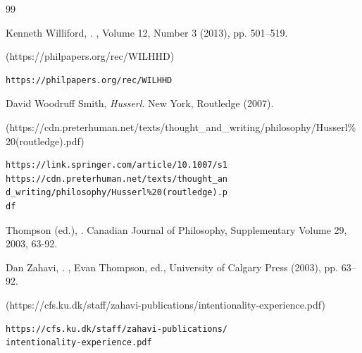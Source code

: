 \begin{thebibliography}{99}
{
Kenneth Williford, 
.
,
Volume 12, Number 3 (2013), pp. 501--519.
%
\begin{boxurl}(https://philpapers.org/rec/WILHHD)
\begin{lstlisting}
https://philpapers.org/rec/WILHHD
\end{lstlisting}
\end{boxurl}




David Woodruff Smith, 
\textit{Husserl}.
New York, Routledge (2007).
%
\begin{boxurl}(https://cdn.preterhuman.net/texts/thought_and_writing/philosophy/Husserl\%20(routledge).pdf)
\begin{lstlisting}
https://link.springer.com/article/10.1007/s1
https://cdn.preterhuman.net/texts/thought_an
d_writing/philosophy/Husserl%20(routledge).p
df
\end{lstlisting}
\end{boxurl}


Thompson (ed.), . Canadian Journal of Philosophy, Supplementary Volume 29, 2003, 63-92.

Dan Zahavi, 
.
, 
Evan Thompson, ed., University of Calgary Press (2003), pp. 63--92.
%
\begin{boxurl}(https://cfs.ku.dk/staff/zahavi-publications/intentionality-experience.pdf)
\begin{lstlisting}
https://cfs.ku.dk/staff/zahavi-publications/
intentionality-experience.pdf
\end{lstlisting}
\end{boxurl}









}


\end{thebibliography}
